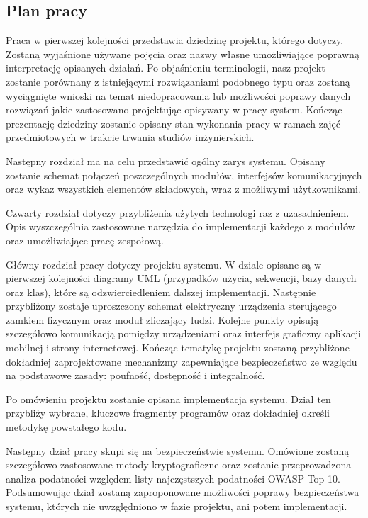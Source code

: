 \newpage
\subsection{Plan pracy}
Praca w pierwszej kolejności przedstawia dziedzinę projektu, którego dotyczy. Zostaną wyjaśnione używane pojęcia oraz nazwy własne umożliwiające poprawną interpretację opisanych działań. Po objaśnieniu terminologii, nasz projekt zostanie porównany z istniejącymi rozwiązaniami podobnego typu oraz zostaną wyciągnięte wnioski na temat niedopracowania lub możliwości poprawy danych rozwiązań jakie zastosowano projektując opisywany w pracy system. Kończąc prezentację dziedziny zostanie opisany stan wykonania pracy w ramach zajęć przedmiotowych w trakcie trwania studiów inżynierskich.

Następny rozdział ma na celu przedstawić ogólny zarys systemu. Opisany zostanie schemat połączeń poszczególnych modułów, interfejsów komunikacyjnych oraz wykaz wszystkich elementów składowych, wraz z możliwymi użytkownikami.

Czwarty rozdział dotyczy przybliżenia użytych technologi raz z uzasadnieniem. Opis wyszczególnia zastosowane narzędzia do implementacji każdego z modułów oraz umożliwiające pracę zespołową.

Główny rozdział pracy dotyczy projektu systemu. W dziale opisane są w pierwszej kolejności diagramy UML (przypadków użycia, sekwencji, bazy danych oraz klas), które są odzwierciedleniem dalszej implementacji. Następnie przybliżony zostaje uproszczony schemat elektryczny urządzenia sterującego zamkiem fizycznym oraz moduł zliczający ludzi. Kolejne punkty opisują szczegółowo komunikacją pomiędzy urządzeniami oraz interfejs graficzny aplikacji mobilnej i strony internetowej. Kończąc tematykę projektu zostaną przybliżone dokładniej zaprojektowane mechanizmy zapewniające bezpieczeństwo ze względu na podstawowe zasady: poufność, dostępność i integralność.

Po omówieniu projektu zostanie opisana implementacja systemu. Dział ten przybliży wybrane, kluczowe fragmenty programów oraz dokładniej określi metodykę powstałego kodu. 

Następny dział pracy skupi się na bezpieczeństwie systemu. Omówione zostaną szczegółowo zastosowane metody kryptograficzne oraz zostanie przeprowadzona analiza podatności względem listy najczęstszych podatności OWASP Top 10. Podsumowując dział zostaną zaproponowane możliwości poprawy  bezpieczeństwa systemu, których nie uwzględniono w fazie projektu, ani potem implementacji.

